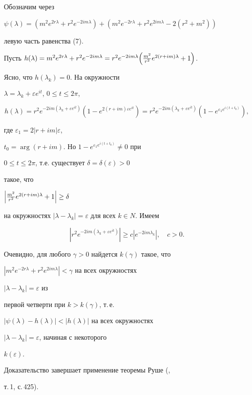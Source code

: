  


\begin{pf} Обозначим через  


$\psi(\lambda)=(m^2e^{2r\lambda}+r^2e^{-2im\lambda}) 


+(m^2e^{-2r\lambda}+r^2e^{2im\lambda}-2(r^2+m^2))$ 


левую часть равенства (7).


Пусть $h(\lambda)=m^2e^{2r\lambda}+r^2e^{-2im\lambda} 


=r^2e^{-2im\lambda}\Bigl(\frac{m^2}{r^2}e^{2(r+im)\lambda}+1\Bigr)$. 


Ясно, что $h(\lambda_k)=0$. На окружности 


$\lambda=\lambda_k+\varepsilon e^{it}$, $0\le t\le 2\pi$, 


$$ 


h(\lambda)=r^2e^{-2im(\lambda_k+\varepsilon e^{it})} 


(1-e^{2(r+im)\varepsilon e^{it}})= 


r^2 e^{-2im(\lambda_k+\varepsilon e^{it})} 


(1-e^{\varepsilon_1 e^{i(t+t_0)}}), 


$$ 


где $\varepsilon_1=2|r+im|\varepsilon$, 


$t_0=\arg(r+im)$. Но $1-e^{\varepsilon_1e^{i(t+t_0)}}\ne 0$ при 


$0\le t\le 2\pi$, т.е. существует $\delta=\delta(\varepsilon)>0$ 


такое, что 


$\Bigl|\frac{m^2}{r^2}e^{2(r+im)\lambda}+1\Bigr|\ge\delta$ 


на окружностях $|\lambda-\lambda_k|=\varepsilon$ для всех $k\in N$. Имеем 


$$ 


|r^2e^{-2im(\lambda_k+\varepsilon e^{it})}|\ge c|e^{-2im\lambda_k}|, 


\quad c>0. 


$$ 


Очевидно, для любого $\gamma>0$ найдется $k(\gamma)$ такое, что 


$|m^2e^{-2r\lambda}+r^2e^{2im\lambda}|<\gamma$ на всех окружностях 


$|\lambda-\lambda_k|=\varepsilon$ из 


первой четверти при $k>k(\gamma)$, т.\,е. 


$|\psi(\lambda)-h(\lambda)|<|h(\lambda)|$ на всех окружностях 


$|\lambda-\lambda_k|=\varepsilon$, начиная с некоторого 


$k(\varepsilon)$. 


Доказательство завершает применение теоремы Руше (\cite{Mar}, 


т.\,1, с.\,425). 


\end{pf} 


